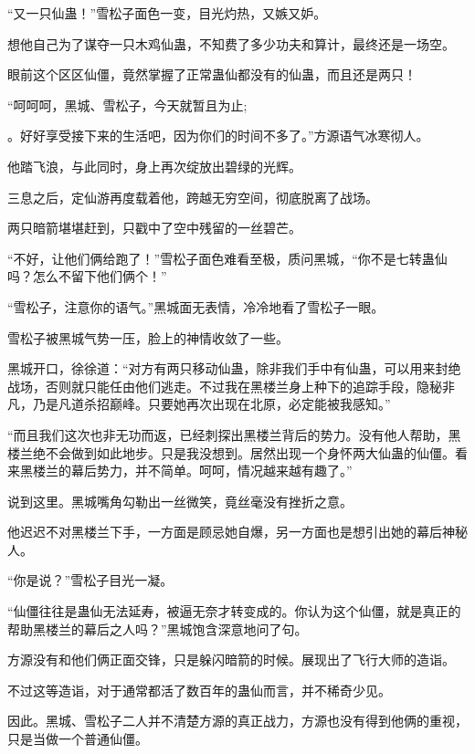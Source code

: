 
\begin{this_body}



“又一只仙蛊！”雪松子面色一变，目光灼热，又嫉又妒。

想他自己为了谋夺一只木鸡仙蛊，不知费了多少功夫和算计，最终还是一场空。

眼前这个区区仙僵，竟然掌握了正常蛊仙都没有的仙蛊，而且还是两只！

“呵呵呵，黑城、雪松子，今天就暂且为止;

。好好享受接下来的生活吧，因为你们的时间不多了。”方源语气冰寒彻人。

他踏飞浪，与此同时，身上再次绽放出碧绿的光辉。

三息之后，定仙游再度载着他，跨越无穷空间，彻底脱离了战场。

两只暗箭堪堪赶到，只戳中了空中残留的一丝碧芒。

“不好，让他们俩给跑了！”雪松子面色难看至极，质问黑城，“你不是七转蛊仙吗？怎么不留下他们俩个！”

“雪松子，注意你的语气。”黑城面无表情，冷冷地看了雪松子一眼。

雪松子被黑城气势一压，脸上的神情收敛了一些。

黑城开口，徐徐道：“对方有两只移动仙蛊，除非我们手中有仙蛊，可以用来封绝战场，否则就只能任由他们逃走。不过我在黑楼兰身上种下的追踪手段，隐秘非凡，乃是凡道杀招巅峰。只要她再次出现在北原，必定能被我感知。”

“而且我们这次也非无功而返，已经刺探出黑楼兰背后的势力。没有他人帮助，黑楼兰绝不会做到如此地步。只是我没想到。居然出现一个身怀两大仙蛊的仙僵。看来黑楼兰的幕后势力，并不简单。呵呵，情况越来越有趣了。”

说到这里。黑城嘴角勾勒出一丝微笑，竟丝毫没有挫折之意。

他迟迟不对黑楼兰下手，一方面是顾忌她自爆，另一方面也是想引出她的幕后神秘人。

“你是说？”雪松子目光一凝。

“仙僵往往是蛊仙无法延寿，被逼无奈才转变成的。你认为这个仙僵，就是真正的帮助黑楼兰的幕后之人吗？”黑城饱含深意地问了句。

方源没有和他们俩正面交锋，只是躲闪暗箭的时候。展现出了飞行大师的造诣。

不过这等造诣，对于通常都活了数百年的蛊仙而言，并不稀奇少见。

因此。黑城、雪松子二人并不清楚方源的真正战力，方源也没有得到他俩的重视，只是当做一个普通仙僵。


\end{this_body}
